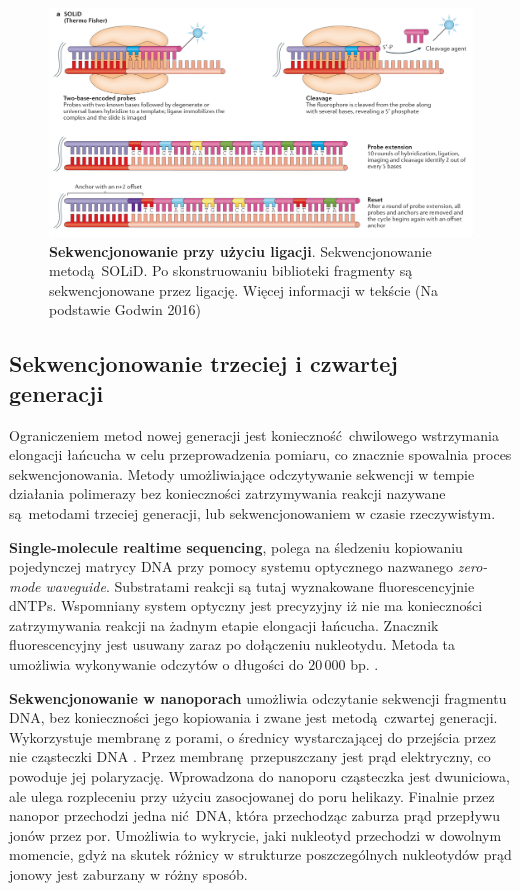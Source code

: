 \documentclass[two column, twoside, a4paper]{article}
\begin{document}
\begin{figure}[btp]
	\begin{tcolorbox}
		\centering
		\includegraphics[width=\textwidth]{./figury/solid.png}
		\caption{\textbf{Sekwencjonowanie przy użyciu ligacji}. Sekwencjonowanie metodą SOLiD. Po skonstruowaniu biblioteki fragmenty są sekwencjonowane przez ligację. Więcej informacji w tekście (Na podstawie Godwin 2016)}\label{fig::solid}
	\end{tcolorbox}
\end{figure}

\subsection{Sekwencjonowanie trzeciej i czwartej\\ generacji}

Ograniczeniem metod nowej generacji jest konieczność chwilowego wstrzymania elongacji łańcucha w celu przeprowadzenia pomiaru, co znacznie spowalnia proces sekwencjonowania. Metody umożliwiające odczytywanie sekwencji w tempie działania polimerazy bez konieczności zatrzymywania reakcji nazywane są metodami trzeciej generacji, lub sekwencjonowaniem w czasie rzeczywistym.

\textbf{Single-molecule realtime sequencing}, polega na śledzeniu kopiowaniu pojedynczej matrycy DNA przy pomocy systemu optycznego nazwanego \textit{zero-mode waveguide}. Substratami reakcji są tutaj wyznakowane fluorescencyjnie dNTPs. Wspomniany system optyczny jest precyzyjny iż nie ma konieczności zatrzymywania reakcji na żadnym etapie elongacji łańcucha.  Znacznik fluorescencyjny jest usuwany zaraz po dołączeniu nukleotydu. Metoda ta umożliwia wykonywanie odczytów o długości do $20\,000$ bp. \autocite{Brown2019}.

\textbf{Sekwencjonowanie w nanoporach} umożliwia odczytanie sekwencji fragmentu DNA, bez konieczności jego kopiowania i zwane jest metodą czwartej generacji. Wykorzystuje membranę z porami, o średnicy wystarczającej do przejścia przez nie cząsteczki DNA \autocite{Feng2015}. Przez membranę przepuszczany jest prąd elektryczny, co powoduje jej polaryzację. Wprowadzona do nanoporu cząsteczka jest dwuniciowa, ale ulega rozpleceniu przy użyciu zasocjowanej do poru helikazy. Finalnie przez nanopor przechodzi jedna nić DNA, która przechodząc zaburza prąd przepływu jonów przez por. Umożliwia to wykrycie, jaki nukleotyd przechodzi w dowolnym momencie, gdyż na skutek różnicy w strukturze poszczególnych nukleotydów prąd jonowy jest zaburzany w różny sposób. \autocite{Brown2019}
\end{document}
